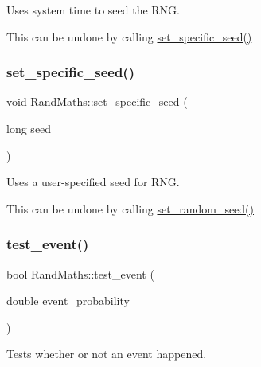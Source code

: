 Uses system time to seed the R\+NG. 

This can be undone by calling {\ttfamily \mbox{\hyperlink{classrcombinator_1_1RandMaths_a76c7dc43d0faee17d4b328bd342934e0}{set\+\_\+specific\+\_\+seed()}}} \mbox{\label{classrcombinator_1_1RandMaths_a76c7dc43d0faee17d4b328bd342934e0}} 
\subsubsection{\texorpdfstring{set\+\_\+specific\+\_\+seed()}{set\_specific\_seed()}}
{\footnotesize\ttfamily void Rand\+Maths\+::set\+\_\+specific\+\_\+seed (\begin{DoxyParamCaption}\item[{long}]{seed }\end{DoxyParamCaption})}



Uses a user-\/specified seed for R\+NG. 

This can be undone by calling {\ttfamily \mbox{\hyperlink{classrcombinator_1_1RandMaths_a2b61e31de6067ffa35531d5bde40f4c6}{set\+\_\+random\+\_\+seed()}}} \mbox{\label{classrcombinator_1_1RandMaths_a183686140a9da18ad40c7e048ee8914e}} 
\subsubsection{\texorpdfstring{test\+\_\+event()}{test\_event()}}
{\footnotesize\ttfamily bool Rand\+Maths\+::test\+\_\+event (\begin{DoxyParamCaption}\item[{double}]{event\+\_\+probability }\end{DoxyParamCaption})}



Tests whether or not an event happened. 

